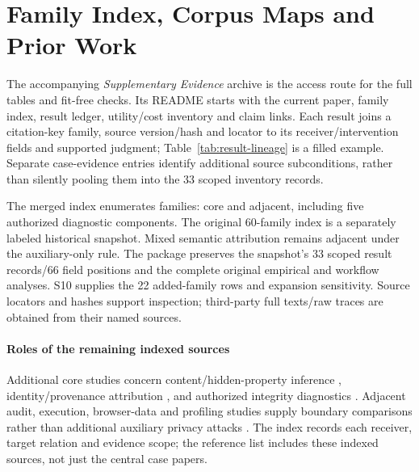 \section{Family Index, Corpus Maps and Prior Work}\label{app:final-ledger}
The accompanying \emph{Supplementary Evidence} archive is the access route for the full tables and fit-free checks. Its README starts with the current paper, family index, result ledger, utility/cost inventory and claim links. Each result joins a citation-key family, source version/hash and locator to its receiver/intervention fields and supported judgment; Table~\ref{tab:result-lineage} is a filled example. Separate case-evidence entries identify additional source subconditions, rather than silently pooling them into the 33 scoped inventory records.

The merged index enumerates \FinalN{} families: \FinalCore{} core and \FinalAdjacent{} adjacent, including five authorized diagnostic components. The original 60-family index is a separately labeled historical snapshot. Mixed semantic attribution remains adjacent under the auxiliary-only rule. The package preserves the snapshot's 33 scoped result records/66 field positions and the complete original empirical and workflow analyses. S10 supplies the 22 added-family rows and expansion sensitivity. Source locators and hashes support inspection; third-party full texts/raw traces are obtained from their named sources.

\paragraph{Roles of the remaining indexed sources}
Additional core studies concern content/hidden-property inference \cite{abubakar2026contention,carlini2024remote,song2026personafingerprint,weiss2026detokenization,ding2025moecho,yona2024stealing}, identity/provenance attribution \cite{oderinwale2026procgrep,alhazbi2025rhythm,chaudhuri2025energon,weng2026archsnoop}, and authorized integrity diagnostics \cite{gan2026clawguard,george2025cycles,solomon2026lumimas}. Adjacent audit, execution, browser-data and profiling studies supply boundary comparisons rather than additional auxiliary privacy attacks \cite{roh2026spillage,qiao2026topr,umar2025secemb,wu2025mobileagents,mudryi2025hidden,ukani2025browserprivacy,nazari2024llmfin,anwar2026infernet}. The index records each receiver, target relation and evidence scope; the reference list includes these indexed sources, not just the central case papers.

